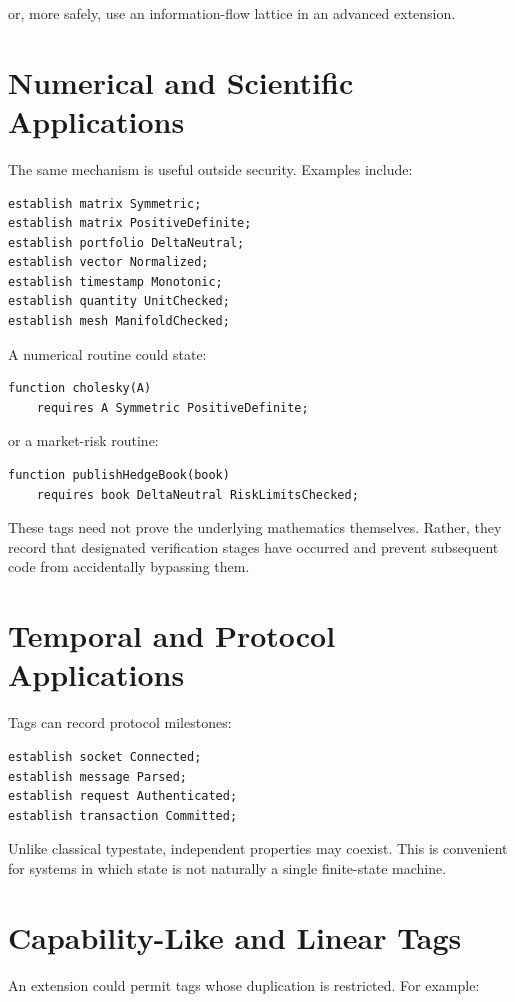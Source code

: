 \documentclass[11pt]{article}
\begin{document}
or, more safely, use an information-flow lattice in an advanced extension.

\section{Numerical and Scientific Applications}
The same mechanism is useful outside security. Examples include:

\begin{lstlisting}
establish matrix Symmetric;
establish matrix PositiveDefinite;
establish portfolio DeltaNeutral;
establish vector Normalized;
establish timestamp Monotonic;
establish quantity UnitChecked;
establish mesh ManifoldChecked;
\end{lstlisting}

A numerical routine could state:

\begin{lstlisting}
function cholesky(A)
    requires A Symmetric PositiveDefinite;
\end{lstlisting}

or a market-risk routine:

\begin{lstlisting}
function publishHedgeBook(book)
    requires book DeltaNeutral RiskLimitsChecked;
\end{lstlisting}

These tags need not prove the underlying mathematics themselves. Rather, they record that designated verification stages have occurred and prevent subsequent code from accidentally bypassing them.

\section{Temporal and Protocol Applications}
Tags can record protocol milestones:

\begin{lstlisting}
establish socket Connected;
establish message Parsed;
establish request Authenticated;
establish transaction Committed;
\end{lstlisting}

Unlike classical typestate, independent properties may coexist. This is convenient for systems in which state is not naturally a single finite-state machine.

\section{Capability-Like and Linear Tags}
An extension could permit tags whose duplication is restricted. For example:
\end{document}
